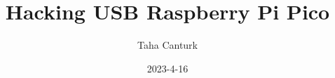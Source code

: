 \documentclass{article}
\title{Hacking USB \- Raspberry Pi Pico}
\author{Taha Canturk}<++>
\date{2023-4-16}<++>
\begin{document}
\Section{}
\SubSection{}

\paragraph{}
\end{document}
